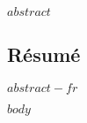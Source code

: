\documentclass[%
    paper=A4,              %
    twoside=true,          %
    openright,             %
    parskip=half,          %
    chapterprefix=true,    %
    11pt,                  %
    headings=normal,       %
    bibliography=totoc,    %
    listof=totoc,          %
    titlepage=on,          %
    captions=tableabove,   %
    chapterprefix=false,   %
    appendixprefix=false,  %
    draft=false,           %
]{scrreprt}
\begin{document}
$abstract$

\clearpage

\begin{otherlanguage}{french}

\section*{Résumé}

$abstract-fr$

\end{otherlanguage}
\cleardoublepage %

\setcounter{tocdepth}{2}  %

\makeatletter
{}
\makeatother

\tableofcontents %
\cleardoublepage %
\fi


\pagestyle{scrheadings}  %


$body$

% 
% 
\end{document}
